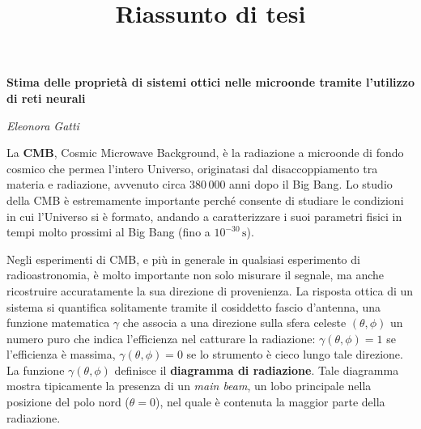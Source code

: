 \documentclass[12pt,a4paper,final]{report}			%
\title{Riassunto di tesi}
\begin{document}
\begin{center}
	\LARGE \textbf{Stima delle proprietà di sistemi ottici nelle microonde tramite l'utilizzo di reti neurali}
\end{center}
\begin{center}
	\normalsize \textit{Eleonora Gatti}
\end{center}

\vspace{5mm}

La \textbf{CMB}, Cosmic Microwave Background, \`e la radiazione a microonde di fondo cosmico che permea l’intero Universo, originatasi dal disaccoppiamento tra materia e radiazione, avvenuto circa 380\,000 anni dopo il Big Bang. Lo studio della CMB è estremamente importante perché consente di studiare le condizioni in cui l'Universo si è formato, andando a caratterizzare i suoi parametri fisici in tempi molto prossimi al Big Bang (fino a $10^{-30}\,\text{s}$).

Negli esperimenti di CMB, e più in generale in qualsiasi esperimento di radioastronomia, è molto importante non solo misurare il segnale, ma anche ricostruire accuratamente la sua direzione di provenienza. La risposta ottica di un sistema si quantifica solitamente tramite il cosiddetto fascio d'antenna, una funzione matematica $\gamma$ che associa a una direzione sulla sfera celeste $(\theta, \phi)$ un numero puro che indica l'efficienza nel catturare la radiazione: $\gamma(\theta, \phi) = 1$ se l'efficienza è massima, $\gamma(\theta, \phi) = 0$ se lo strumento è cieco lungo tale direzione. La funzione $\gamma(\theta, \phi)$ definisce il \textbf{diagramma di radiazione}. Tale diagramma mostra tipicamente la presenza di un \textit{main beam}, un lobo principale nella posizione del polo nord ($\theta = 0$), nel quale è contenuta la maggior parte della radiazione.
\end{document}
